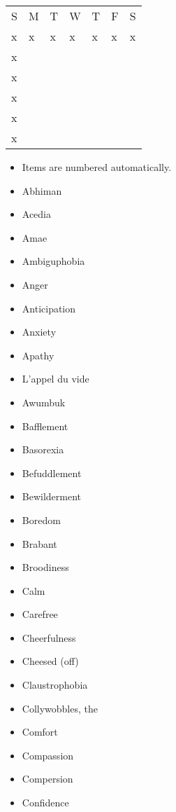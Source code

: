 \documentclass[a5paper]{article}
\begin{document}
\begin{table}[htp]
\begin{table}[htp]
\begin{table}[]
\begin{tabular}{lllllll}
\cline{1-1}
S                       & M & T & W & T & F & S \\ \cline{1-1}
x                       & x & x & x & x & x & x \\
x                       &   &   &   &   &   &   \\
x                       &   &   &   &   &   &   \\
x                       &   &   &   &   &   &   \\ \cline{1-1}
\multicolumn{1}{|l|}{x} &   &   &   &   &   &   \\ \cline{1-1}
x                       &   &   &   &   &   &   \\ \cline{1-1}
\end{tabular}
\end{table}
\begin{itemize}
	\item Items are numbered automatically.
	\item Abhiman
	\item Acedia
	\item Amae
	\item Ambiguphobia
	\item Anger
	\item Anticipation
	\item Anxiety
	\item Apathy
	\item L’appel du vide
	\item Awumbuk
	\item Bafflement
	\item Basorexia
	\item Befuddlement
	\item Bewilderment
	\item Boredom
	\item Brabant
	\item Broodiness
	\item Calm
	\item Carefree
	\item Cheerfulness
	\item Cheesed (off)
	\item Claustrophobia
	\item Collywobbles, the
	\item Comfort
	\item Compassion
	\item Compersion
	\item Confidence

\end{itemize}
\end{table}
\end{table}
\end{document}
